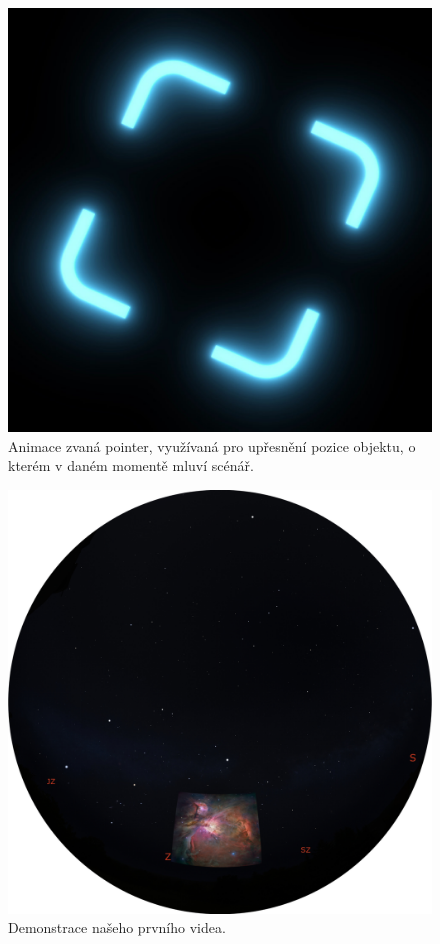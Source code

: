 \documentclass[12pt,a4paper,titlepage]{article}
\begin{document}
\begin{figure}[ht]
\centering
\includegraphics[width=.5\textwidth]{pointer.eps}
\caption{Animace zvaná pointer, využívaná pro upřesnění pozice objektu, o kterém v daném momentě mluví scénář.}
\label{img:pointer}
\end{figure}

\begin{figure}[ht]
\centering
\includegraphics[width=.7\textwidth]{prosinec.eps}
\caption{Demonstrace našeho prvního videa.}
\label{img:prosinec}
\end{figure}
\end{document}

